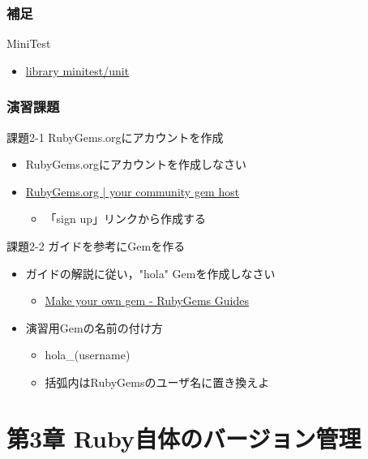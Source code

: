 \documentclass[t, aspectratio=169]{beamer}
\begin{document}
\section{補足}
\label{sec-2-3}
\begin{frame}[label=sec-2-3-1]{MiniTest}
\begin{itemize}
\item \href{http://docs.ruby-lang.org/ja/2.0.0/library/minitest=2funit.html}{library minitest/unit}
\end{itemize}
\end{frame}

\section{演習課題}
\label{sec-2-4}
\begin{frame}[label=sec-2-4-1]{課題2-1 RubyGems.orgにアカウントを作成}
\begin{itemize}
\item RubyGems.orgにアカウントを作成しなさい
\item \href{https://rubygems.org/}{RubyGems.org | your community gem host}
\begin{itemize}
\item 「sign up」リンクから作成する
\end{itemize}
\end{itemize}
\end{frame}

\begin{frame}[label=sec-2-4-2]{課題2-2 ガイドを参考にGemを作る}
\begin{itemize}
\item ガイドの解説に従い，"hola" Gemを作成しなさい
\begin{itemize}
\item \href{http://guides.rubygems.org/make-your-own-gem/}{Make your own gem - RubyGems Guides}
\end{itemize}
\item 演習用Gemの名前の付け方
\begin{itemize}
\item hola\_(username)
\item 括弧内はRubyGemsのユーザ名に置き換えよ
\end{itemize}
\end{itemize}
\end{frame}

\part{第3章 Ruby自体のバージョン管理}
\label{sec-3}
\end{document}
